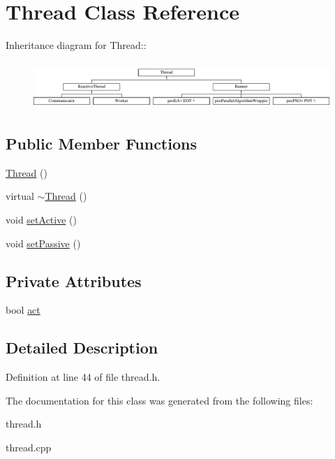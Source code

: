 \hypertarget{classThread}{
\section{Thread Class Reference}
\label{classThread}
}
Inheritance diagram for Thread::\begin{figure}[H]
\begin{center}
\leavevmode
\includegraphics[height=1.80645cm]{classThread}
\end{center}
\end{figure}
\subsection*{Public Member Functions}
\begin{CompactItemize}
\item 
\hypertarget{classThread_95c703fb8f2f27cb64f475a8c940864a}{
\hyperlink{classThread_95c703fb8f2f27cb64f475a8c940864a}{Thread} ()}
\label{classThread_95c703fb8f2f27cb64f475a8c940864a}

\item 
\hypertarget{classThread_37d9edd3a1a776cbc27dedff949c9726}{
virtual \hyperlink{classThread_37d9edd3a1a776cbc27dedff949c9726}{$\sim$Thread} ()}
\label{classThread_37d9edd3a1a776cbc27dedff949c9726}

\item 
\hypertarget{classThread_e197c46f8f62ecce6d2a7fe95bdc5b38}{
void \hyperlink{classThread_e197c46f8f62ecce6d2a7fe95bdc5b38}{set\-Active} ()}
\label{classThread_e197c46f8f62ecce6d2a7fe95bdc5b38}

\item 
\hypertarget{classThread_20632ffe9ddfa2a478afb0c84dc1096b}{
void \hyperlink{classThread_20632ffe9ddfa2a478afb0c84dc1096b}{set\-Passive} ()}
\label{classThread_20632ffe9ddfa2a478afb0c84dc1096b}

\end{CompactItemize}
\subsection*{Private Attributes}
\begin{CompactItemize}
\item 
\hypertarget{classThread_1b155d63bca3096ac4a1d039aea83c7c}{
bool \hyperlink{classThread_1b155d63bca3096ac4a1d039aea83c7c}{act}}
\label{classThread_1b155d63bca3096ac4a1d039aea83c7c}

\end{CompactItemize}


\subsection{Detailed Description}




Definition at line 44 of file thread.h.

The documentation for this class was generated from the following files:\begin{CompactItemize}
\item 
thread.h\item 
thread.cpp\end{CompactItemize}
